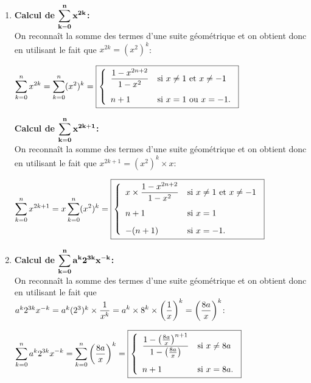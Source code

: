 \documentclass[a4paper, 11pt,reqno]{article}
\begin{document}
\begin{correction}   \;
\begin{enumerate}
\item \textbf{Calcul de $\mathbf{\displaystyle \sum\limits_{k=0}^{n} x^{2k}}$:}\\
\noindent On reconna\^{i}t la somme des termes d'une suite g\'eom\'etrique et on obtient donc en utilisant le fait que $x^{2k}=(x^2)^k$:\\
\noindent  
\begin{center}
$\ddp \sum\limits_{k=0}^{n} x^{2k}=\ddp \sum\limits_{k=0}^{n} (x^2)^{k}=\fbox{$\left\lbrace \begin{array}{ll}  \ddp\frac{1-x^{2n+2}}{1-x^2} & \hbox{si}\ x\not= 1\ \hbox{et}\ x\not=-1\vsec\\ n+1 & \hbox{si}\ x= 1\ \hbox{ou}\ x=-1.   \end{array}\right.$}$\\
\end{center}

\textbf{Calcul de $\mathbf{\displaystyle \sum\limits_{k=0}^{n} x^{2k+1}}$:}\\
\noindent On reconna\^{i}t la somme des termes d'une suite g\'eom\'etrique et on obtient donc en utilisant le fait que $x^{2k+1}=(x^2)^k\times x$:\\
\noindent \begin{center}
$\ddp \sum\limits_{k=0}^{n} x^{2k+1}=x\ddp \sum\limits_{k=0}^{n} (x^2)^{k}=\fbox{$\left\lbrace \begin{array}{ll}  x\times \ddp\frac{1-x^{2n+2}}{1-x^2} & \hbox{si}\ x\not= 1\ \hbox{et}\ x\not=-1\vsec\\ n+1 & \hbox{si}\ x= 1\vsec\\ -(n+1)& \hbox{si}\ x=-1.   \end{array}\right.$}$
\end{center}
\item  \textbf{Calcul de $\mathbf{\displaystyle \sum\limits_{k=0}^{n} a^k 2^{3k} x^{-k}}$:}\\
\noindent On reconna\^{i}t la somme des termes d'une suite g\'eom\'etrique et on obtient donc en utilisant le fait que $a^k 2^{3k} x^{-k}=a^k(2^3)^k\times \displaystyle\frac{1}{x^k}=a^k\times 8^k\times \left(\displaystyle\frac{1}{x} \right)^k=\left(\displaystyle\frac{8a}{x} \right)^k$:\\

\begin{center}
 $\ddp \sum\limits_{k=0}^{n} a^k 2^{3k} x^{-k}=\ddp \sum\limits_{k=0}^{n} \left(\ddp\frac{8a}{x}\right)^k=\fbox{$\left\lbrace \begin{array}{ll}  \ddp\frac{1-\left( \frac{8a}{x}\right)^{n+1}}{1-\left( \frac{8a}{x}\right)} & \hbox{si}\ x\not= 8a \vsec\\ n+1 & \hbox{si}\ x= 8a.   \end{array}\right.$}$ 
\end{center}


\end{enumerate}
\end{correction}
\end{document}
